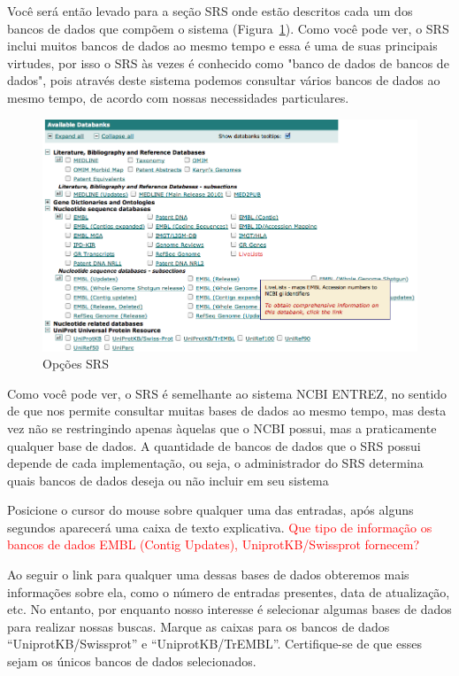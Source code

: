 \documentclass[letter,11pt]{book}
\begin{document}
Você será então levado para a seção SRS onde estão descritos cada um dos bancos de dados que compõem o sistema (Figura~\ref{SRSDBs}). Como você pode ver, o SRS inclui muitos bancos de dados ao mesmo tempo e essa é uma de suas principais virtudes, por isso o SRS às vezes é conhecido como "banco de dados de bancos de dados", pois através deste sistema podemos consultar vários bancos de dados ao mesmo tempo, de acordo com nossas necessidades particulares. 

\begin{figure}[ht]
\centering
   \includegraphics[width=12cm]{Figs/SRSDBs.png}
  \caption{\label{SRSDBs}Opções SRS}
\end{figure}

Como você pode ver, o SRS é semelhante ao sistema NCBI ENTREZ, no sentido de que nos permite consultar muitas bases de dados ao mesmo tempo, mas desta vez não se restringindo apenas àquelas que o NCBI possui, mas a praticamente qualquer base de dados. A quantidade de bancos de dados que o SRS possui depende de cada implementação, ou seja, o administrador do SRS determina quais bancos de dados deseja ou não incluir em seu sistema 

Posicione o cursor do mouse sobre qualquer uma das entradas, após alguns segundos aparecerá uma caixa de texto explicativa. \textcolor{red}{Que tipo de informação os bancos de dados EMBL (Contig Updates), UniprotKB/Swissprot fornecem?} 

Ao seguir o link para qualquer uma dessas bases de dados obteremos mais informações sobre ela, como o número de entradas presentes, data de atualização, etc. No entanto, por enquanto nosso interesse é selecionar algumas bases de dados para realizar nossas buscas. Marque as caixas para os bancos de dados ``UniprotKB/Swissprot'' e ``UniprotKB/TrEMBL''. Certifique-se de que esses sejam os únicos bancos de dados selecionados. 
\end{document}
